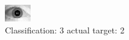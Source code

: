 \begin{figure}[h!]
\begin{center}
\includegraphics[width=0.60\columnwidth]{figures/ID1730_class_3_target_2.png}
\end{center}
\caption{ Classification: 3 actual target: 2}
\label{fig:ID1730_class_3_target_2}
\end{figure}
